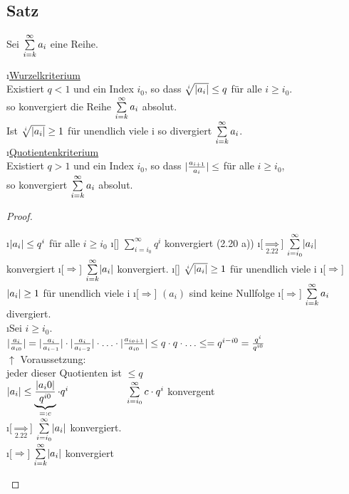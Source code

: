 \subsection[Satz: Wurzel- und Quotientenkriterium]{Satz}
Sei $\sum\limits_{i=k}^{\infty} a_i$ eine Reihe.\\
\begin{enumerate}[a)]
\i \underline{Wurzelkriterium}\\
Existiert $q < 1$ und ein Index $i_0$, so dass $\sqrt[i]{\lvert a_i \rvert} \leq q$ für alle $i \geq i_0$.\\
so konvergiert die Reihe $\sum\limits_{i=k}^{\infty} a_i$ absolut.\\
Ist $\sqrt[i]{\lvert a_i \rvert} \geq 1$ für unendlich viele i so divergiert $\sum\limits_{i=k}^{\infty} a_i$.\\
\i \underline{Quotientenkriterium}\\
Existiert $q > 1$ und ein Index $i_0$, so dass $\lvert \frac{a_{i+1}}{a_i }  \rvert \leq$ für alle $i \geq i_0$,\\
so konvergiert $\sum\limits_{i=k}^{\infty} a_i$ absolut. 
\end{enumerate}
\begin{proof} \ \\
\begin{enumerate}[a)]
\i $\lvert a_i \rvert \leq q^i$ für alle $i \geq i_0$
\i[] $\sum\limits_{i=i_0}^{\infty} q^i$ konvergiert (2.20 a)) 
\i[$\underset{2.22}{\Rightarrow}$] $\sum\limits_{i=i_0}^{\infty} \lvert a_i \rvert$ konvergiert
\i[$\Rightarrow$] $\sum\limits_{i=k}^{\infty} \lvert a_i \rvert$ konvergiert.
\i[] $\sqrt[i]{\lvert a_i \rvert} \geq 1$ für unendlich viele i
\i[$\Rightarrow$] $\lvert a_i \rvert \geq 1$ für unendlich viele i
\i[$\Rightarrow$] $(a_i)$ sind keine Nullfolge
\i[$\Rightarrow$] $\sum\limits_{i=k}^{\infty} a_i$ divergiert.\\
\i Sei $i \geq i_0$.\\
$\lvert \frac{a_i}{a_{i0}} \rvert = \lvert \frac{a_i}{a_{i-1}} \rvert \cdot \lvert \frac{a_i}{a_{i-2}} \rvert \cdot \ldots \cdot \lvert \frac{a_{io+1}}{a_{i0} }  \rvert \leq q \cdot q \cdot \ldots \leq = q^{i-i0} = \frac{q^i}{q^{i0}}$\\
\hspace*{5.55cm} $\uparrow$ Voraussetzung: \\
\hspace*{5cm} jeder dieser Quotienten ist $\leq q$\\
$\lvert a_i \rvert \leq \underbrace{\frac{\lvert a_i0 \rvert}{q^{i0}}}_{=:c} \cdot q^i \hspace*{2cm} \sum\limits_{i=i_0}^{\infty} c \cdot q^i$ konvergent\\
\i[$\underset{2.22}{\Rightarrow}$] $\sum\limits_{i=i_0}^{\infty} \lvert a_i \rvert$ konvergiert.\\
\i[$\Rightarrow$] $\sum\limits_{i=k}^{\infty} \lvert a_i \rvert$ konvergiert
\end{enumerate}
\end{proof}
